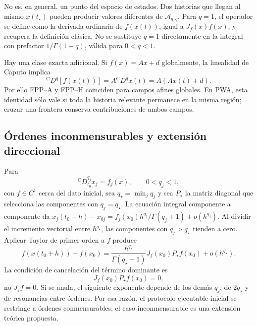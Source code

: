 No es, en general, un punto del espacio de estados. Dos historias que llegan
al mismo \(x(t_\star)\) pueden producir valores diferentes de
\(\mathcal A_{q,q}\). Para \(q=1\), el operador se define como la
derivada ordinaria de \(f(x(t))\), igual a \(J_f(x)f(x)\), y recupera
la definición clásica. No se sustituye \(q=1\) directamente en la
integral con prefactor \(1/\Gamma(1-q)\), válida para \(0<q<1\).

Hay una clase exacta adicional. Si \(f(x)=Ax+d\) globalmente, la linealidad de
Caputo implica
\begin{equation}
 {}^{\mathrm C}D^q[f(x(t))]
 =A{}^{\mathrm C}D^qx(t)=A(Ax(t)+d).
 \label{eq:pp-affine-exact-caputo}
\end{equation}
Por ello FPP--A y FPP--H coinciden para campos afines globales. En PWA, esta
identidad sólo vale si toda la historia relevante permanece en la misma
región; cruzar una frontera conserva contribuciones de ambos campos.

\subsection{Órdenes inconmensurables y extensión direccional}

Para
\begin{equation}
 {}^{\mathrm C}D_{t_0}^{q_j}x_j=f_j(x),\qquad 0<q_j<1,
 \label{eq:pp-incommensurate}
\end{equation}
con \(f\in C^1\) cerca del dato inicial, sea \(q_\star=\min_jq_j\) y
sea \(P_\star\) la matriz diagonal que selecciona
las componentes con \(q_j=q_\star\). La ecuación integral componente a
componente da
\(x_j(t_0+h)-x_{0j}=f_j(x_0)h^{q_j}/\Gamma(q_j+1)+o(h^{q_j})\).
Al dividir el incremento vectorial entre \(h^{q_\star}\), las componentes
con \(q_j>q_\star\) tienden a cero. Aplicar Taylor de primer orden a
\(f\) produce
\begin{equation}
 f(x(t_0+h))-f(x_0)
 =\frac{h^{q_\star}}{\Gamma(q_\star+1)}
 J_f(x_0)P_\star f(x_0)+o(h^{q_\star}).
 \label{eq:pp-incommensurate-leading}
\end{equation}
La condición de cancelación del término dominante es
\begin{equation}
 J_f(x_0)P_\star f(x_0)=0,
 \label{eq:pp-incommensurate-condition}
\end{equation}
no \(J_f f=0\). Si se anula, el siguiente exponente depende de los demás
\(q_j\), de \(2q_\star\) y de resonancias entre órdenes. Por esa razón, el
protocolo ejecutable inicial se restringe a órdenes conmensurables; el caso
inconmensurable es una extensión teórica propuesta.

